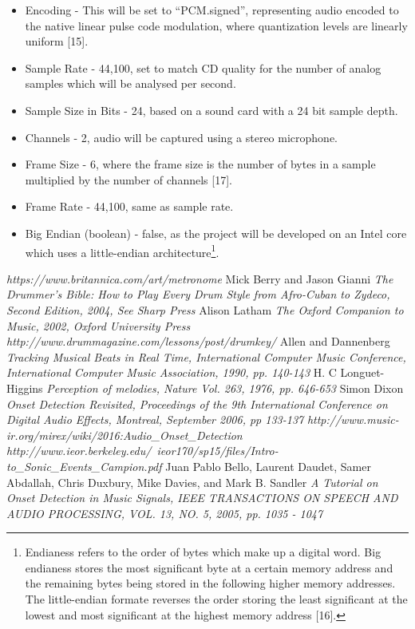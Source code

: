 \documentclass[a4paper, 11pt]{article}
\begin{document}
\begin{itemize}
\item Encoding - This will be set to ``PCM.signed'', representing audio encoded to the native linear pulse code modulation, where quantization levels are linearly uniform [15].
\item Sample Rate - 44,100, set to match CD quality for the number of analog samples which will be analysed per second. 
\item Sample Size in Bits - 24, based on a sound card with a 24 bit sample depth.
\item Channels - 2, audio will be captured using a stereo microphone.
\item Frame Size - 6, where the frame size is the number of bytes in a sample multiplied by the number of channels [17].
\item Frame Rate - 44,100, same as sample rate.
\item Big Endian (boolean) - false, as the project will be developed on an Intel core which uses a little-endian architecture\footnote{Endianess refers to the order of bytes which make up a digital word. Big endianess stores the most significant byte at a certain memory address and the remaining bytes being stored in the following higher memory addresses. The little-endian formate reverses the order storing the least significant at the lowest and most significant at the highest memory address [16].}.
\end{itemize}




\begin{thebibliography}{99}
\textit{https://www.britannica.com/art/metronome}
Mick Berry and Jason Gianni
\textit{The Drummer's Bible: How to Play Every Drum Style from Afro-Cuban to Zydeco, Second Edition, 2004, See Sharp Press}
Alison Latham
\textit{The Oxford Companion to Music, 2002, Oxford University Press}
\textit{http://www.drummagazine.com/lessons/post/drumkey/}
Allen and Dannenberg
\textit{Tracking Musical Beats in Real Time, International Computer Music Conference, International Computer Music Association, 1990, pp. 140-143}
H. C Longuet-Higgins
\textit{Perception of melodies, Nature Vol. 263, 1976, pp. 646-653}
Simon Dixon
\textit{Onset Detection Revisited, Proceedings of the 9th International Conference on Digital Audio Effects, Montreal, September 2006, pp 133-137}
\textit{http://www.music-ir.org/mirex/wiki/2016:Audio\_Onset\_Detection}
\textit{http://www.ieor.berkeley.edu/~ieor170/sp15/files/Intro-to\_Sonic\_Events\_Campion.pdf}
Juan Pablo Bello, Laurent Daudet, Samer Abdallah, Chris Duxbury, Mike Davies, and Mark B. Sandler 
\textit{A Tutorial on Onset Detection in Music Signals, IEEE TRANSACTIONS ON SPEECH AND AUDIO PROCESSING, VOL. 13, NO. 5, 2005, pp. 1035 - 1047}

\end{thebibliography}
\end{document}
